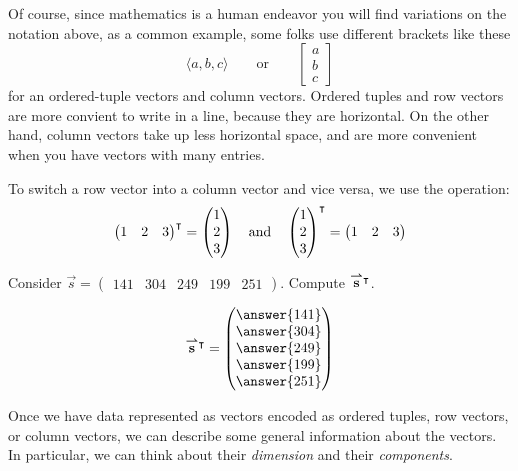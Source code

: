 \documentclass{ximera}
\begin{document}
Of course, since mathematics is a human endeavor you will find variations on the notation above, as a common example, some folks use different brackets like these
\[
\langle a, b, c\rangle \qquad\text{or}\qquad
\begin{bmatrix}
  a\\
  b\\
  c
\end{bmatrix}
\]
for an ordered-tuple vectors and column vectors. Ordered tuples and
row vectors are more convient to write in a line, because they are
horizontal. On the other hand, column vectors take up less horizontal
space, and are more convenient when you have vectors with many entries.


\begin{definition}
  To switch a row vector into a column vector and vice versa, we use the  operation:
  \[
  \begin{pmatrix} 1 &  2 & 3 \end{pmatrix}^\intercal =
  \begin{pmatrix} 1 \\ 2 \\ 3 \end{pmatrix}
  \quad\text{and}\quad
  \begin{pmatrix} 1 \\ 2 \\ 3 \end{pmatrix}^\intercal =
  \begin{pmatrix} 1 &  2 & 3 \end{pmatrix}
  \]
\end{definition}


\begin{question}
  Consider $\vec{s} = \begin{pmatrix}141 & 304 & 249 & 199 & 251 \end{pmatrix}$. Compute ${\overset{\boldsymbol{\rightharpoonup}}{\mathbf{s}}}\hspace{0in}^\intercal$.
  \begin{prompt}
  \[
  \vec{s}^\transpose  = \begin{pmatrix}\answer{141} \\ \answer{304} \\ \answer{249} \\ \answer{199} \\ \answer{251} \end{pmatrix}
  \]
  \end{prompt}
\end{question}

Once we have data represented as vectors encoded as ordered tuples,
row vectors, or column vectors, we can describe some general
information about the vectors. In particular, we can think about their
\textit{dimension} and their \textit{components}.
\end{document}
